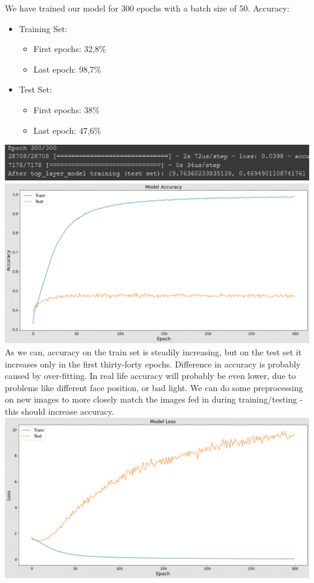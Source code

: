 We have trained our model for 300 epochs with a batch size of 50.
Accuracy:
\begin{itemize}
      \item Training Set:
        \begin{itemize}
            \item First epochs: 32,8\%
            \item Last epoch: 98,7\%
        \end{itemize}
      \item Test Set:
        \begin{itemize}
            \item First epochs: 38\%
            \item Last epoch: 47,6\%
        \end{itemize}
\end{itemize}
\includegraphics[scale=0.9]{images/modelOne/evaluationOne.png}
\includegraphics[scale=0.5]{images/modelOne/accOne.png}
As we can, accuracy on the train set is steadily increasing, but on the test set it increases only in the first thirty-forty epochs. Difference in accuracy is probably caused by over-fitting. In real life accuracy will probably be even lower, due to problems like different face position, or bad light. We can do some preprocessing on new images to more closely match the images fed in during training/testing - this should increase accuracy.\\
\includegraphics[scale=0.5]{images/modelOne/lossOne.png}
